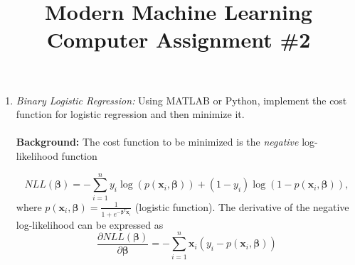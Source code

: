 \documentclass[11pt,oneside,a4paper]{article}
\begin{document}
\title{Modern Machine Learning\\Computer Assignment \#2}
\date{\vspace{-5ex}}
\maketitle
\begin{enumerate}
	
  \item \textit{Binary Logistic Regression:} Using MATLAB or Python, implement the cost function for logistic regression and then minimize it.
  \\
  \\
  \textbf{Background:} The cost function to be minimized is the \textit{negative} log-likelihood function
  
  \begin{equation}\nonumber
  NLL(\pmb{\beta})=-\sum_{i=1}^{n}y_i \log\left(p(\mathbf{x}_i, \pmb{\beta} )  \right)+(1-y_i)\log\left(1-p(\mathbf{x}_i, \pmb{\beta} )  \right),
  \end{equation}  
  where $p(\mathbf{x}_i, \pmb{\beta} ) =\frac{1}{1+e^{-\pmb{\beta}^T\mathbf{x}_i}}$ (logistic function). The derivative of the negative log-likelihood can be expressed as
  \begin{equation}\nonumber
  \frac{\partial NLL(\pmb{\beta})}{\partial \pmb{\beta}}=-\sum_{i=1}^{n}\mathbf{x}_i\left(y_i-p(\mathbf{x}_i, \pmb{\beta} )  \right)
  \end{equation}
  

\end{enumerate}
\end{document}
